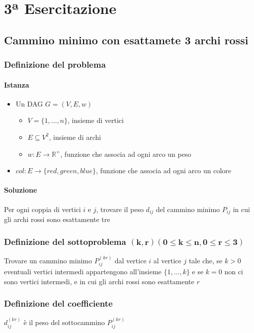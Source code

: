 \chapter{3ª Esercitazione}

\section{Cammino minimo con esattamete 3 archi rossi}

\subsection{Definizione del problema}

\subsubsection{Istanza}
\begin{itemize}
    \item Un DAG $G=(V,E,w)$
    \begin{itemize}
        \item $V  =\{1,\dots,n\}$, insieme di vertici
        \item $E \subseteq V^2$, insieme di archi
        \item $w:E \to \mathbb{R}^+$, funzione che associa ad ogni arco un peso
    \end{itemize}
    \item $col:E \to \{red,green,blue\}$, funzione che associa ad ogni arco un colore
\end{itemize}

\subsubsection{Soluzione}
Per ogni coppia di vertici $i$ e $j$, trovare il peso $d_{ij}$ del cammino minimo $P_{ij}$ in cui gli archi rossi sono esattamente tre

\subsection{Definizione del sottoproblema $\mathbf{(k,r)(0 \leq k \leq n, 0 \leq r \leq 3)}$}
Trovare un cammino minimo $P_{ij}^{(kr)}$ dal vertice $i$ al vertice $j$ tale che, se $k>0$ eventuali vertici intermedi appartengono all'insieme $\{1, \dots, k\}$ e se $k=0$ non ci sono vertici intermedi, e in cui gli archi rossi sono esattamente $r$

\subsection{Definizione del coefficiente}
$d_{ij}^{(kr)}$ è il peso del sottocammino $P_{ij}^{(kr)}$

